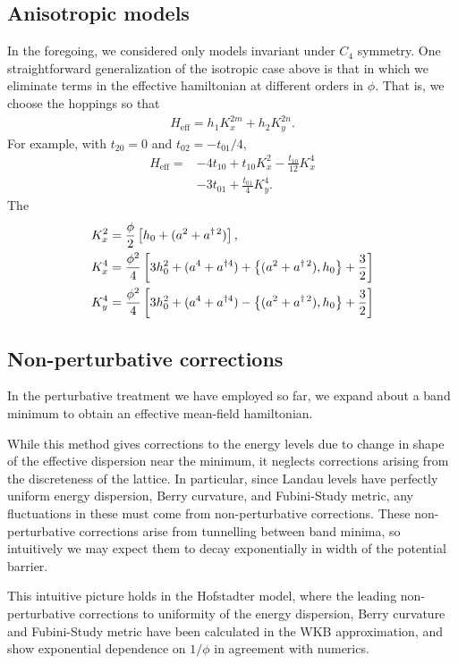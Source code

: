 \documentclass[aps,prb,twocolumn,letterpaper,twoside,nobalancelastpage,groupedaddress,amsmath,amssymb,floatfix,citeautoscript]{revtex4-1}
\begin{document}
\subsection{Anisotropic models}
In the foregoing, we considered only models invariant under $C_4$ symmetry. 
One straightforward generalization of the isotropic case above is that in which we eliminate terms in the effective hamiltonian at different orders in $\phi$. That is, we choose the hoppings so that
\begin{align*}
H_{\text{eff}} = h_1 K_x^{2m} + h_2 K_y^{2n}.
\end{align*}
For example, with $t_{20} = 0$ and $t_{02}=-t_{01}/4$, 
\begin{align*}
H_{\text{eff}} = &-4t_{10} + t_{10}K_x^2 - \frac{t_{10}}{12}K_x^4\\
&-3t_{01}+\frac{t_{01}}{4}K_y^4. 
\end{align*}
The 
\begin{align*}
K_x^2 &= \frac{\phi}{2}\left[h_0 + (a^2 + a^{\dag\,2})\right],\\
K_x^4 &= \frac{\phi^2}{4}\left[3h_0^2  + (a^{4} + a^{\dag 4}) + \acomm{(a^2 + a^{\dag\,2})}{h_0} + \frac{3}{2}\right]\\
K_y^4 &= \frac{\phi^2}{4}\left[3h_0^2 + (a^4 + a^{\dag 4}) -\acomm{(a^2 + a^{\dag\,2})}{h_0} + \frac{3}{2} \right]
\end{align*}

\subsection{Non-perturbative corrections}
In the perturbative treatment we have employed so far, we expand about a band minimum to obtain an effective mean-field hamiltonian.

While this method gives corrections to the energy levels due to change in shape of the effective dispersion near the minimum, it neglects corrections arising from the discreteness of the lattice. In particular, since Landau levels have perfectly uniform energy dispersion, Berry curvature, and Fubini-Study metric, any fluctuations in these must come from non-perturbative corrections. These non-perturbative corrections arise from tunnelling between band minima, so intuitively we may expect them to decay exponentially in width of the potential barrier. 

This intuitive picture holds in the Hofstadter model, where the leading non-perturbative corrections to uniformity of the energy dispersion, Berry curvature and Fubini-Study metric have been calculated in the WKB approximation, and show exponential dependence on $1/\phi$ in agreement with numerics.
\end{document}
